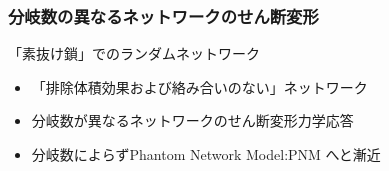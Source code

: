 \documentclass[12pt, dvipdfmx]{beamer}
\begin{document}
\begin{frame}
	\frametitle{分岐数の異なるネットワークのせん断変形}
	\begin{alertblock}{「素抜け鎖」でのランダムネットワーク}
		\begin{itemize}
			\item \alert{「排除体積効果および絡み合いのない」}ネットワーク
		\end{itemize}
	\end{alertblock}
	\begin{itemize}
        \item 分岐数が異なるネットワークのせん断変形力学応答
		\item 分岐数によらずPhantom Network Model:PNM へと漸近
	\end{itemize}


\end{frame}
\end{document}
